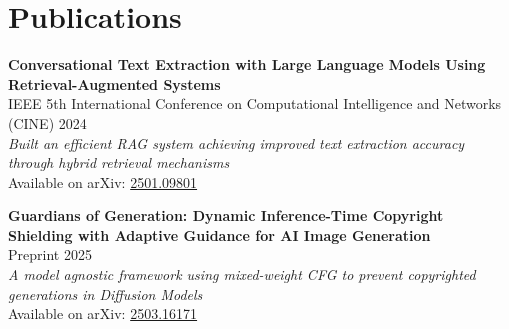 \documentclass[letterpaper,10pt]{article}
\newenvironment{resume_list}{
  \vspace{-7pt}
  \begin{itemize}[itemsep=-2px, parsep=1pt, leftmargin=30pt]
}{
  \end{itemize}
  \vspace{-2pt}
}
\begin{document}
\section{Publications}
\begin{resume_list}
    \item \textbf{Conversational Text Extraction with Large Language Models Using Retrieval-Augmented Systems}\\
    IEEE 5th International Conference on Computational Intelligence and Networks (CINE) \hfill 2024\\
    \textit{Built an efficient RAG system achieving improved text extraction accuracy through hybrid retrieval mechanisms}\\
    Available on arXiv: \href{https://arxiv.org/abs/2501.09801}{2501.09801}

    \item \textbf{Guardians of Generation: Dynamic Inference-Time Copyright Shielding with Adaptive Guidance for AI Image Generation}\\
    Preprint \hfill 2025\\
    \textit{A model agnostic framework using mixed-weight CFG to prevent copyrighted generations in Diffusion Models}\\
    Available on arXiv: \href{https://arxiv.org/abs/2503.16171}{2503.16171}
\end{resume_list}
\end{document}
